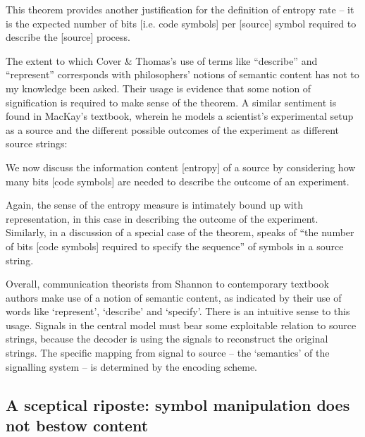 \documentclass[12pt]{article}
\begin{document}
\begin{myquote}
This theorem provides another justification for the definition of entropy rate -- it is the expected number of bits [i.e. code symbols] per [source] symbol required to describe the [source] process.
\par\hspace*{\fill}\citet[115]{cover2006elements}
\end{myquote}

\noindent The extent to which Cover \& Thomas's use of terms like ``describe'' and ``represent'' corresponds with philosophers' notions of semantic content has not to my knowledge been asked.
Their usage is evidence that some notion of signification is required to make sense of the theorem.
A similar sentiment is found in MacKay's textbook, wherein he models a scientist's experimental setup as a source and the different possible outcomes of the experiment as different source strings:

\begin{myquote}
We now discuss the information content [entropy] of a source by considering how many bits [code symbols] are needed to describe the outcome of an experiment.
\par\hspace*{\fill}\citet[73]{mackay2003information}
\end{myquote}

\noindent Again, the sense of the entropy measure is intimately bound up with representation, in this case in describing the outcome of the experiment.
Similarly, in a discussion of a special case of the theorem, \citet[397]{shannon1948mathematicalc} speaks of ``the number of bits [code symbols] required to specify the sequence'' of symbols in a source string.

Overall, communication theorists from Shannon to contemporary textbook authors make use of a notion of semantic content, as indicated by their use of words like `represent', `describe' and `specify'.
There is an intuitive sense to this usage.
Signals in the central model must bear some exploitable relation to source strings, because the decoder is using the signals to reconstruct the original strings.
The specific mapping from signal to source -- the `semantics' of the signalling system -- is determined by the encoding scheme.

\subsection{A sceptical riposte: symbol manipulation does not bestow content}
\end{document}
